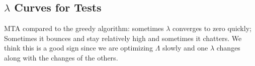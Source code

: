 \documentclass{article}
\begin{document}
\subsection{$\lambda$ Curves for Tests}
MTA compared to the greedy algorithm: sometimes $\lambda$ converges to zero quickly; Sometimes it bounces and stay relatively high and sometimes it chatters. We think this is a good sign since we are optimizing $\Lambda$ slowly and one $\lambda$ changes along with the changes of the others.
\begin{figure}
\centering
\begin{adjustwidth}{-1.2in}{-1.2in}
\hfill
{}
\hfill
{}


\end{adjustwidth}
\end{figure}
\end{document}
